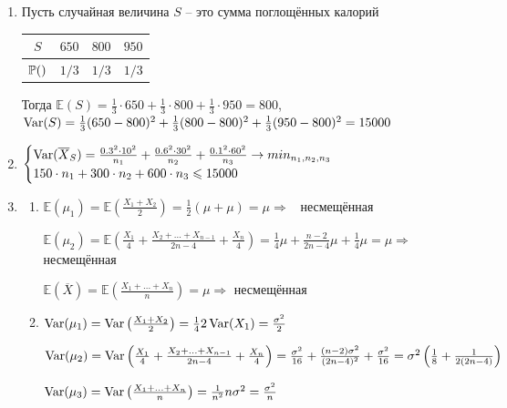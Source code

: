 \documentclass[12pt, a4paper]{article}\usepackage[]{graphicx}\usepackage[]{color}
\begin{document}
\begin{enumerate}
	\item Пусть случайная величина $S$ – это сумма поглощённых калорий
	
		\begin{tabular}{c|ccc}
			$S$ & $650$ & $800$ & $950$ \\
			\hline
			$\P()$ & $1/3$ & $1/3$ & $1/3$ \\
		\end{tabular}
		
		Тогда $\mathbb{E}(S) = \frac{1}{3}\cdot 650 +  \frac{1}{3}\cdot 800 +  \frac{1}{3}\cdot 950 = 800$, $\Var(S) = \frac{1}{3}(650-800)^2 + \frac{1}{3}(800-800)^2 + \frac{1}{3}(950-800)^2 = 15000$
		
	\item
		$
		\begin{cases}
		\Var(\overline{X}_S) = \frac{0.3^2\cdot 10^2}{n_1} + \frac{0.6^2 \cdot 30^2}{n_2} + \frac{0.1^2 \cdot 60^2}{n_3} \to min_{n_1, n_2, n_3} \\
		150\cdot n_1 + 300 \cdot n_2 + 600 \cdot n_3 \leq 15000
		\end{cases}
		$
		
	\item 
		\begin{enumerate}
			\item $\mathbb{E}(\mu_1) = \mathbb{E}\left(\frac{X_1+X_2}{2}\right)  = \frac{1}{2}(\mu+\mu) = \mu \Rightarrow$  несмещённая
			
			$\mathbb{E}(\mu_2) = \mathbb{E} \left(\frac{X_1}{4} + \frac{X_2+...+X_{n-1}}{2n-4} + \frac{X_n}{4}\right) = \frac{1}{4}\mu + \frac{n-2}{2n-4}\mu + \frac{1}{4}\mu = \mu \Rightarrow$ несмещённая
			
			$\mathbb{E}(\overline{X}) = \mathbb{E}\left(\frac{X_1 + ... + X_n}{n}\right) = \mu \Rightarrow$ несмещённая
			
			\item $\Var(\mu_1) = \Var\left(\frac{X_1+X_2}{2}\right)  = \frac{1}{4}2\Var(X_1) = \frac{\sigma^2}{2}$
			
			$\Var(\mu_2) = \Var \left(\frac{X_1}{4} + \frac{X_2+...+X_{n-1}}{2n-4} + \frac{X_n}{4}\right)  = \frac{\sigma^2}{16} + \frac{(n-2)\sigma^2}{(2n-4)^2} + \frac{\sigma^2}{16} = \sigma^2\left(\frac{1}{8} + \frac{1}{2(2n-4)} \right)$
			
			$\Var(\mu_3) = \Var\left(\frac{X_1 + ... + X_n}{n}\right)  = \frac{1}{n^2}n\sigma^2 = \frac{\sigma^2}{n}$
		\end{enumerate}
		

\end{enumerate}
\end{document}
